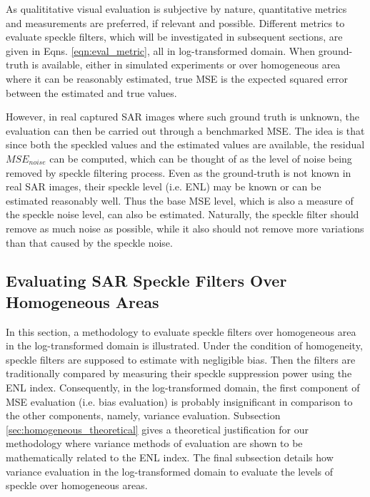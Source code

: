As qualititative visual evaluation is subjective by nature,
	quantitative metrics and measurements are preferred, if relevant and possible.
Different metrics to evaluate speckle filters, which will be investigated in subsequent sections, 
are given in Eqns. \ref{eqn:eval_metric}, all in log-transformed domain.
When ground-truth is available, 
	either in simulated experiments or over homogeneous area where it can be reasonably estimated, 
	true MSE is the expected squared error between the estimated and true values.

However, in real captured SAR images where such ground truth is unknown, the evaluation can then be carried out 
through a benchmarked MSE. 
The idea is that since both the speckled values and the estimated values are available, the residual $MSE_{noise}$ 
can be computed, which can be thought of as the level of noise being removed by speckle filtering process.
Even as the ground-truth is not known in real SAR images, their speckle level (i.e. ENL) may be known or can be 
estimated reasonably well.
Thus the base MSE level, which is also a measure of the speckle noise level, can also be estimated.
Naturally, the speckle filter should remove as much noise as possible, 
	while it also should not remove more variations than that caused by the speckle noise.

\subsection{Evaluating SAR Speckle Filters Over Homogeneous Areas}
        

In this section, a methodology to evaluate speckle filters over homogeneous area in the log-transformed domain is 
illustrated. Under the condition of homogeneity, speckle filters are supposed to estimate with negligible bias.
Then the filters are traditionally compared by measuring their speckle suppression power using the ENL index.
Consequently, in the log-transformed domain, the first component of MSE evaluation (i.e. bias evaluation) is 
probably insignificant in comparison to the other components, namely, variance evaluation. 
Subsection \ref{sec:homogeneous_theoretical} gives a theoretical justification for our methodology where variance 
methods of evaluation are shown to be mathematically related to the ENL index.
The final subsection details how variance evaluation in the log-transformed domain to evaluate the levels of speckle 
over homogeneous areas.

